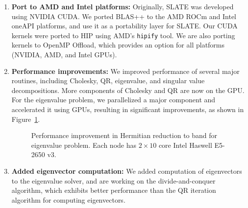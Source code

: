 \begin{enumerate}

\item \textbf{Port to AMD and Intel platforms:}
Originally, SLATE was developed using NVIDIA CUDA. We ported BLAS++ to
the AMD ROCm and Intel oneAPI platforms, and use it as a portability
layer for SLATE. Our CUDA kernels were ported to HIP using
AMD's \texttt{hipify} tool. We are also porting kernels to OpenMP
Offload, which provides an option for all platforms (NVIDIA, AMD, and
Intel GPUs).

\item \textbf{Performance improvements:}
We improved performance of several major routines, including
Cholesky, QR, eigenvalue, and singular value decompositions. More components
of Cholesky and QR are now on the GPU. For the eigenvalue
problem, we parallelized a major component and accelerated it using
GPUs, resulting in significant improvements, as shown in
Figure~\ref{fig:slate-he2hb}.

\begin{figure}
    \centering
    \caption{Performance improvement in Hermitian reduction to band for
    eigenvalue problem. Each node has $2 \times 10$ core Intel Haswell E5-2650 v3.}
    \label{fig:slate-he2hb}
\end{figure}

\item \textbf{Added eigenvector computation:}
We added computation of eigenvectors to the eigenvalue solver, and are
working on the divide-and-conquer algorithm, which exhibits
better performance than the QR iteration algorithm for computing
eigenvectors.

\end{enumerate}

